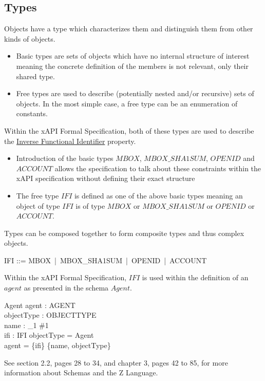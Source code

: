 \documentclass[../main.tex]{subfiles}
\begin{document}
\subsection{Types}
Objects have a type which characterizes them and distinguish them from other kinds of objects.
\begin{itemize}
\item Basic types are sets of objects which have no internal structure of interest meaning the concrete definition of the members is not relevant, only their shared type.
\item Free types are used to describe (potentially nested and/or recursive) sets of objects. In the most simple case, a free type can be an enumeration of constants.
\end{itemize}
Within the xAPI Formal Specification, both of these types are used to describe the
\href{https://github.com/adlnet/xAPI-Spec/blob/master/xAPI-Data.md#inversefunctional}{Inverse Functional Identifier}
property.
\begin{itemize}
\item Introduction of the basic types $MBOX$, $MBOX\_SHA1SUM$, $OPENID$ and $ACCOUNT$
  allows the specification to talk about these constraints within the xAPI
  specification without defining their exact structure
\item The free type $IFI$ is defined as one of the above basic types meaning an object
  of type $IFI$ is of type $MBOX$ or $MBOX\_SHA1SUM$ or $OPENID$ or $ACCOUNT$.
\end{itemize}
Types can be composed together to form composite types and thus complex objects.
\begin{zed}
  \also
  IFI ::= MBOX \,|\, MBOX\_SHA1SUM \,|\, OPENID \,|\, ACCOUNT
\end{zed}
Within the xAPI Formal Specification, $IFI$ is used within the definition
of an $agent$ as presented in the schema $Agent$.

\begin{schema}{Agent}
  agent : AGENT \\
  objectType : OBJECTTYPE \\
  name : \finset_1 \#1 \\
  ifi : IFI
  \where
  objectType = Agent \\
  agent = \{ifi\} \cup \power \{name, objectType\}
\end{schema}
See section 2.2, pages 28 to 34, and chapter 3, pages 42 to 85, for more information about Schemas and the Z Language.
\end{document}
